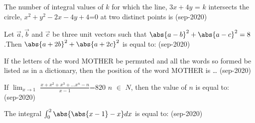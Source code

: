 
\iffalse
\title{02-sep-2020 shift-1}
\author{ee24btech11060}
\section{integer}
\fi
\item  The number of integral values of $k$ for which the line, $3x+4y$ = $k$ intersects the circle, $x^2+y^2-2x-4y+4$=$0$ at two distinct points is
    \hfill(sep-2020)
    \item Let $\Vec{a},\Vec{b}$ and $\Vec{c}$ be three unit vectors such that $\abs{a-b}^2+\abs{a-c}^2=8$.Then $\abs{a+2b}^2+\abs{a+2c}^2$ is equal to:
    \hfill(sep-2020)
    \item If the letters of the word MOTHER be permuted and all the words so formed  be listed as in a dictionary, then the position of the word MOTHER is \dots 
    \hfill(sep-2020)
    \item  If $\lim_{x \to 1}$ $\frac{x+x^2+x^3+\dots x^n-n}{x-1}$=$820$ $n$ $\in$ $N$, then the value of $n$ is equal to: \\
    \hfill(sep-2020)
    \item The integral $\int_{0}^{2} \abs{\abs{x-1}-x}dx$ is equal to:
    \hfill(sep-2020)
